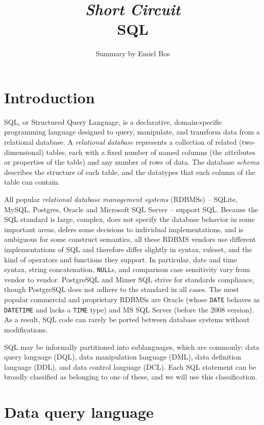 \documentclass[table, xcdraw]{article}%
\title{
\textit{Short Circuit}\\
\vspace{15px}
\huge
SQL\\
}
\author{Summary by Emiel Bos}
\date{}
\begin{document}
\maketitle

\section{Introduction}

SQL, or Structured Query Language, is a declarative, domain-specific programming language designed to query, manipulate, and transform data from a relational database. A \emph{relational database} represents a collection of related (two-dimensional) tables, each with a fixed number of named columns (the attributes or properties of the table) and any number of rows of data. The database \emph{schema} describes the structure of each table, and the datatypes that each column of the table can contain.

All popular \emph{relational database management systems} (RDBMSs) -- SQLite, MySQL, Postgres, Oracle and Microsoft SQL Server -- support SQL. Because the SQL standard is large, complex, does not specify the database behavior in some important areas, defers some decisions to individual implementations, and is ambiguous for some construct semantics, all these RDBMS vendors use different implementations of SQL and therefore differ slightly in syntax, ruleset, and the kind of operators and functions they support. In particular, date and time syntax, string concatenation, \texttt{NULL}s, and comparison case sensitivity vary from vendor to vendor. PostgreSQL and Mimer SQL strive for standards compliance, though PostgreSQL does not adhere to the standard in all cases. The most popular commercial and proprietary RDBMSs are Oracle (whose \texttt{DATE} behaves as \texttt{DATETIME} and lacks a \texttt{TIME} type) and MS SQL Server (before the 2008 version). As a result, SQL code can rarely be ported between database systems without modifications.

SQL may be informally partitioned into sublanguages, which are commonly: data query language (DQL), data manipulation language (DML), data definition language (DDL), and data control language (DCL). Each SQL statement can be broadly classified as belonging to one of these, and we will use this classification.

\section{Data query language}
\end{document}
